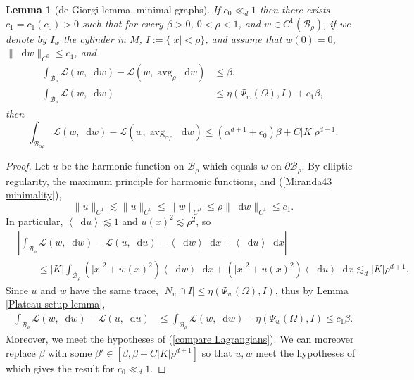 \documentclass[final,12pt, leqno]{brownthesis}
\DeclareMathOperator{\avg}{avg}
\newcommand*\dif{\mathop{}\!\mathrm{d}}
\newcommand{\Lagrange}{\mathscr L}
\def\Japan#1{\left \langle #1 \right \rangle}
\newtheorem{lemma}[theorem]{Lemma}
\theoremstyle{definition}
\numberwithin{equation}{section}
\begin{document}
\begin{lemma}[de Giorgi lemma, minimal graphs]\label{Miranda43}
If $c_0 \ll_d 1$ then there exists $c_1 = c_1(c_0) > 0$ such that for every $\beta > 0$, $0 < \rho < 1$, and $w \in C^1(\mathscr B_\rho)$, if we denote by
$I_w$ the cylinder in $M$, $I := \{|x| < \rho\}$, and assume that $w(0) = 0$, $\|\dif w\|_{C^0} \leq c_1$, and
\begin{align}
\int_{\mathscr B_\rho} \Lagrange(w, \dif w) - \Lagrange(w, \avg_\rho \dif w) &\leq \beta \label{Miranda43 oscillation}, \\
\int_{\mathscr B_\rho} \Lagrange(w, \dif w) &\leq \eta(\Psi_w(\Omega), I) + c_1 \beta \label{Miranda43 minimality},
\end{align}
then
\begin{equation}\label{Miranda43 concl}
\int_{\mathscr B_{\alpha \rho}} \Lagrange(w, \dif w) - \Lagrange(w, \avg_{\alpha \rho} \dif w) \leq (\alpha^{d + 1} + c_0) \beta + C|K|\rho^{d + 1}.
\end{equation}
\end{lemma}
\begin{proof}
Let $u$ be the harmonic function on $\mathscr B_\rho$ which equals $w$ on $\partial \mathscr B_\rho$.
By elliptic regularity, the maximum principle for harmonic functions, and (\ref{Miranda43 minimality}),
$$\|u\|_{C^1} \lesssim \|u\|_{C^0} \leq \|w\|_{C^0} \leq \rho \|\dif w\|_{C^1} \leq c_1.$$
In particular, $\Japan{\dif u} \lesssim 1$ and $u(x)^2 \lesssim \rho^2$, so
\begin{align*}
&\left|\int_{\mathscr B_\rho} \Lagrange(w, \dif w) - \Lagrange(u, \dif u) - \Japan{\dif w} \dif x + \Japan{\dif u} \dif x\right| \\
&\qquad \leq |K| \int_{\mathscr B_\rho} (|x|^2 + w(x)^2) \Japan{\dif w} \dif x + (|x|^2 + u(x)^2) \Japan{\dif u} \dif x
\lesssim_d |K| \rho^{d + 1}.
\end{align*}
Since $u$ and $w$ have the same trace, $|N_u \cap I| \leq \eta(\Psi_w(\Omega), I)$, thus by Lemma \ref{Plateau setup lemma},
\begin{align*}
\int_{\mathscr B_\rho} \Lagrange(w, \dif w) - \Lagrange(u, \dif u) &\leq \int_{\mathscr B_\rho} \Lagrange(w, \dif w) - \eta(\Psi_w(\Omega), I) \leq c_1 \beta.
\end{align*}
Moreover, we meet the hypotheses of (\ref{compare Lagrangians}).
We can moreover replace $\beta$ with some $\beta' \in [\beta, \beta + C|K|\rho^{d + 1}]$ so that $u, w$ meet the hypotheses of \cite[Lemma 6.2]{Giusti77} which gives the result for $c_0 \ll_d 1$.
\end{proof}
\end{document}
